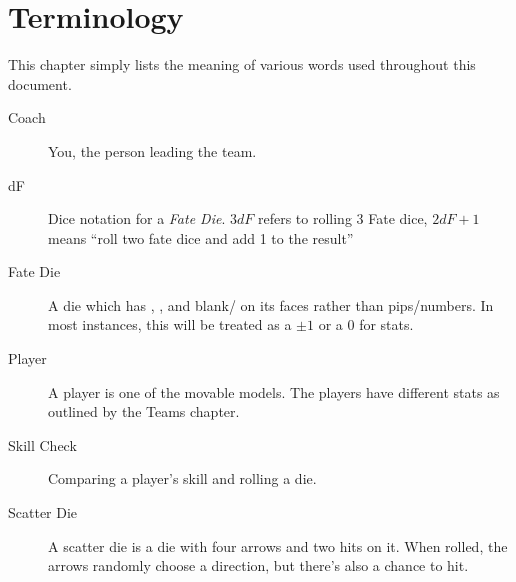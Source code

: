 \chapter{Terminology}
This chapter simply lists the meaning of various words used throughout this document.

\begin{description}
\item[Coach] You, the person leading the team.
\item[dF] Dice notation for a \textit{Fate Die}. 
$3dF$ refers to rolling 3 Fate dice, $2dF+1$ means ``roll two fate dice and add 1 to the result''
\item[Fate Die] A die which has \plus{}, \minus{}, and blank/\blank{} on its faces rather than pips/numbers.
In most instances, this will be treated as a $\pm 1$ or a 0 for stats.
\item[Player] A player is one of the movable models.
The players have different stats as outlined by the Teams chapter.
\item[Skill Check] Comparing a player's skill and rolling a \fate{} die.
\item[Scatter Die] A scatter die is a die with four arrows and two hits on it. When rolled, the arrows randomly choose a direction, but there's also a chance to hit.
\end{description}